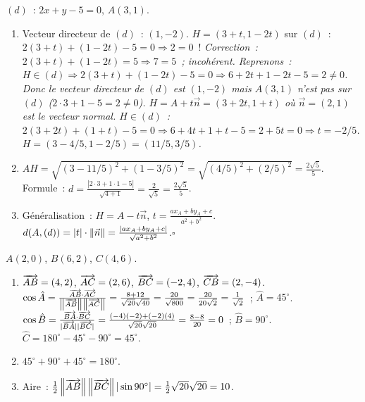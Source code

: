 
$(d)$~: $2x+y-5=0$, $A(3,1)$.
\begin{enumerate}
  \item Vecteur directeur de $(d)$~: $(1,-2)$. $H=(3+t,1-2t)$ sur $(d)$~:
        $2(3+t)+(1-2t)-5=0\Rightarrow2=0$~!
        \emph{Correction~: $2(3+t)+(1-2t)=5\Rightarrow7=5$~; incoh\'erent.
        Reprenons~: $H\in(d)\Rightarrow2(3+t)+(1-2t)-5=0\Rightarrow6+2t+1-2t-5=2\ne0$.
        Donc le vecteur directeur de $(d)$ est $(1,-2)$ mais $A(3,1)$ n'est pas sur $(d)$
        ($2\cdot3+1-5=2\ne0$). $H=A+t\vec{n}=(3+2t,1+t)$ o\`u $\vec{n}=(2,1)$ est le vecteur normal.
        $H\in(d)$~: $2(3+2t)+(1+t)-5=0\Rightarrow6+4t+1+t-5=2+5t=0\Rightarrow t=-2/5$.
        $H=(3-4/5,1-2/5)=(11/5,3/5)$.}
  \item $AH=\sqrt{(3-11/5)^2+(1-3/5)^2}=\sqrt{(4/5)^2+(2/5)^2}=\frac{2\sqrt{5}}{5}$.
        Formule~: $d=\frac{|2\cdot3+1\cdot1-5|}{\sqrt{4+1}}=\frac{2}{\sqrt{5}}=\frac{2\sqrt{5}}{5}$.\checkmark
  \item G\'en\'eralisation~: $H=A-t\vec{n}$, $t=\frac{ax_A+by_A+c}{a^2+b^2}$.
        $d(A,(d))=|t|\cdot\left\|\vec{n}\right\|=\frac{|ax_A+by_A+c|}{\sqrt{a^2+b^2}}$.\hfill$\square$
\end{enumerate}


$A(2,0)$, $B(6,2)$, $C(4,6)$.
\begin{enumerate}
  \item $\overrightarrow{AB}=(4,2)$, $\overrightarrow{AC}=(2,6)$, $\overrightarrow{BC}=(-2,4)$, $\overrightarrow{CB}=(2,-4)$.
        $\cos\hat{A}=\frac{\overrightarrow{AB}\cdot\overrightarrow{AC}}{\left\|\overrightarrow{AB}\right\|\left\|\overrightarrow{AC}\right\|}
        =\frac{8+12}{\sqrt{20}\sqrt{40}}=\frac{20}{\sqrt{800}}=\frac{20}{20\sqrt{2}}=\frac{1}{\sqrt{2}}$~; $\hat{A}=45^{\circ}$.
        $\cos\hat{B}=\frac{\overrightarrow{BA}\cdot\overrightarrow{BC}}{|\overrightarrow{BA}||\overrightarrow{BC}|}
        =\frac{(-4)(-2)+(-2)(4)}{\sqrt{20}\sqrt{20}}=\frac{8-8}{20}=0$~; $\hat{B}=90^{\circ}$.
        $\hat{C}=180^{\circ}-45^{\circ}-90^{\circ}=45^{\circ}$.
  \item $45^{\circ}+90^{\circ}+45^{\circ}=180^{\circ}$.\checkmark
  \item Aire~: $\frac{1}{2}\left\|\overrightarrow{AB}\right\|\left\|\overrightarrow{BC}\right\||\sin90^{\circ}|
        =\frac{1}{2}\sqrt{20}\sqrt{20}=10$.
\end{enumerate}


